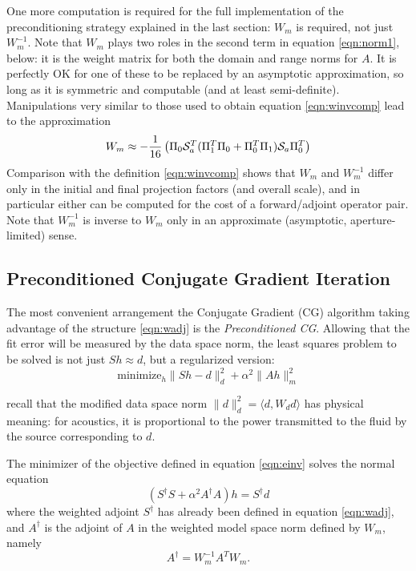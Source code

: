\documentclass[12pt]{geophysics}
\begin{document}
One more computation is required for the full implementation of the
preconditioning strategy explained in the last section: $W_m$ is
required, not just $W_m^{-1}$. Note that $W_m$ plays two roles in the
second term in equation \ref{eqn:norm1}, below: it is the weight matrix for
both the domain and range norms for $A$. It is perfectly OK for one of
these to be replaced by an asymptotic approximation, so long as it is
symmetric and computable (and at least semi-definite). Manipulations
very similar to those used to obtain equation \ref{eqn:winvcomp} lead
to the approximation
\begin{equation}
  \label{wcomp}
 W_m \approx -\frac{1}{16}\left(\Pi_0 {\cal S}_a^T
   (\Pi_1^T \Pi_0 + \Pi_0^T \Pi_1) {\cal S}_a \Pi_0^T\right)
\end{equation}
Comparison with the definition \ref{eqn:winvcomp} shows that
$W_m$ and $W_m^{-1}$ differ only in the initial and
final projection factors (and overall scale), and in particular either
can be computed for the cost of a forward/adjoint operator pair. Note
that $W_m^{-1}$ is inverse to $W_m$ only in an
approximate (asymptotic, aperture-limited) sense.

\subsection{Preconditioned Conjugate Gradient Iteration}

The most convenient arrangement the Conjugate Gradient (CG) algorithm
taking advantage of the structure \ref{eqn:wadj} is the {\em
  Preconditioned CG}. Allowing that the fit error will be measured by
the data space norm, the least squares problem to be solved is not
just $Sh \approx d$, but a regularized version:
\begin{equation}
  \label{eqn:einv}
  \mbox{minimize}_h \|Sh-d\|^2_d + \alpha^2 \|Ah\|^2_m
\end{equation}

 recall that the modified data space norm $\|d\|_d^2 = \langle
d, W_d d\rangle$ has physical meaning: for acoustics, it is
proportional to the power transmitted to the fluid by the source
corresponding to $d$. 

The minimizer of the objective defined in equation \ref{eqn:einv}
solves the normal equation
\begin{equation}
  \label{eqn:norm0}
  (S^{\dagger}S + \alpha^2 A^{\dagger}A)h = S^{\dagger}d 
\end{equation}
where the weighted adjoint $S^{\dagger}$ has already been defined in equation \ref{eqn:wadj}, and $A^{\dagger}$ is the adjoint of $A$ in the weighted model space norm defined by $W_m$, namely
\begin{equation}
  \label{eqn:aadj}
  A^{\dagger} = W_m^{-1}A^TW_m.
\end{equation}
\end{document}
